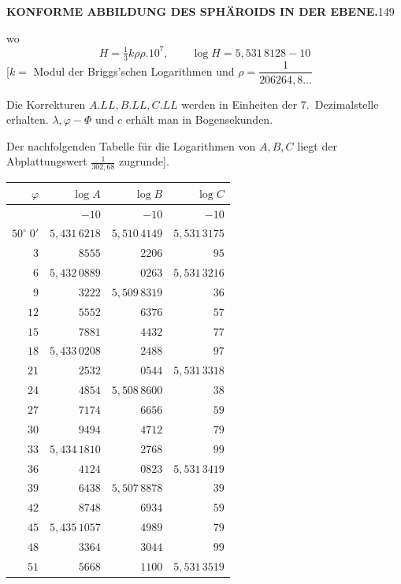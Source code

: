 \par\clearpage
\noindent\null\hfill{\small\textbf{KONFORME ABBILDUNG DES SPHÄROIDS IN DER EBENE.}}\hfill149\par\medskip
\noindent wo
\[H=\tfrac13k\rho\rho.10^7,\qquad\log H=5{,}531\,8128-10\]
[\(k=\) Modul der Briggs'schen Logarithmen und \(\rho=\dfrac1{206264{,}8\ldots}\)

Die Korrekturen \(A.LL,B.LL,C.LL\) werden in Einheiten der 7.~Dezimalstelle erhalten. \(\lambda,\varphi-\Phi\) und \(c\) erhält man in Bogensekunden.

Der nachfolgenden Tabelle für die Logarithmen von \(A,B,C\) liegt der Abplattungswert \(\frac1{302{,}68}\) zugrunde].
\begin{center}
\begingroup\scriptsize\setlength{\tabcolsep}{2pt}\renewcommand{\arraystretch}{1.15}
\begin{tabular}[t]{|r|r|r|r|}\hline
\(\varphi\)&\(\log A\)&\(\log B\)&\(\log C\)\\\hline\hline
&\(-10\)&\(-10\)&\(-10\)\\
\(50^\circ\;0'\)&\(5{,}431\,6218\)&\(5{,}510\,4149\)&\(5{,}531\,3175\)\\
\(3\)&\(8555\)&\(2206\)&\(95\)\\
\(6\)&\(5{,}432\,0889\)&\(0263\)&\(5{,}531\,3216\)\\
\(9\)&\(3222\)&\(5{,}509\,8319\)&\(36\)\\
\(12\)&\(5552\)&\(6376\)&\(57\)\\
\(15\)&\(7881\)&\(4432\)&\(77\)\\
\hline
\(18\)&\(5{,}433\,0208\)&\(2488\)&\(97\)\\
\(21\)&\(2532\)&\(0544\)&\(5{,}531\,3318\)\\
\(24\)&\(4854\)&\(5{,}508\,8600\)&\(38\)\\
\(27\)&\(7174\)&\(6656\)&\(59\)\\
\(30\)&\(9494\)&\(4712\)&\(79\)\\
\hline
\(33\)&\(5{,}434\,1810\)&\(2768\)&\(99\)\\
\(36\)&\(4124\)&\(0823\)&\(5{,}531\,3419\)\\
\(39\)&\(6438\)&\(5{,}507\,8878\)&\(39\)\\
\(42\)&\(8748\)&\(6934\)&\(59\)\\
\(45\)&\(5{,}435\,1057\)&\(4989\)&\(79\)\\
\hline
\(48\)&\(3364\)&\(3044\)&\(99\)\\
\(51\)&\(5668\)&\(1100\)&\(5{,}531\,3519\)\\

\end{tabular}
\end{center}
